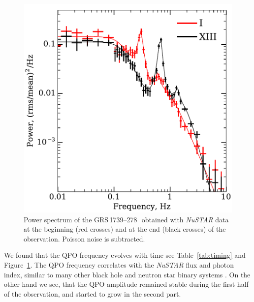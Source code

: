 \documentclass[a4paper,fleqn,usenatbib]{mnras}
\def\grs{{GRS\,1739--278\,}}
\begin{document}
\begin{figure}
        \includegraphics[width=\columnwidth]{qpo_centroid_evolution.pdf}
        \caption{Power spectrum of the \grs\ obtained with {\it NuSTAR} data at the beginning (red crosses) and at the end (black crosses) of the observation. Poisson noise is subtracted.}
        \label{fig:qpo}
\end{figure}


We found that the QPO frequency evolves with time see Table~\ref{tab:timing} and Figure~\ref{fig:qpo}.
The QPO frequency correlates with the {\it NuSTAR} flux and photon index, similar to many other black hole and neutron star binary systems \citep[see, e.g.,][]{vignarca03,2003A&A...407.1039P}.
On the other hand we see, that the QPO amplitude remained stable during the first half of the observation, and started to grow in the second part.
\end{document}
